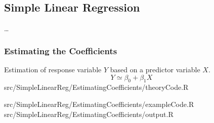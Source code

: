 \subsection{Simple Linear Regression}


\dots

\subsubsection{Estimating the Coefficients}

\begin{RTheory}
	{Estimation of response variable $Y$ based on a predictor variable $X$.%
	$$ Y \simeq \beta_0 + \beta_1X$$}
	{src/SimpleLinearReg/EstimatingCoefficients/theoryCode.R}
\end{RTheory}

\begin{RExample}
	{src/SimpleLinearReg/EstimatingCoefficients/exampleCode.R}
	{src/SimpleLinearReg/EstimatingCoefficients/output.R}
	{}
\end{RExample}